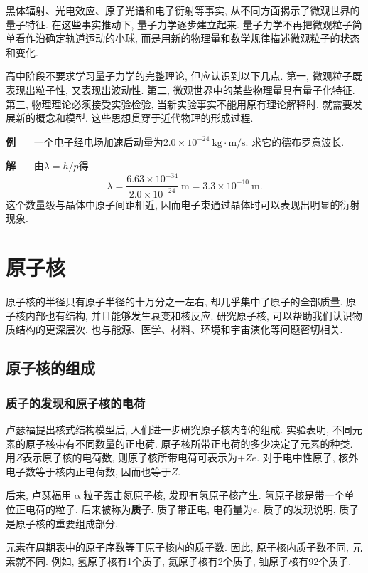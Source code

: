 \documentclass[11pt,a4paper]{ctexbook}
\newcounter{exam}[chapter]
\newcommand{\bre}{\ \ \ }
\newcommand{\examlabel}{\textbf{例\theexam}}
\newcommand{\soln}{\textbf{解}\bre}
\newcommand{\unit}[1]{\ \mathrm{#1}}
\newenvironment{example}{\bigskip\par\refstepcounter{exam}\examlabel\bre}{\par}
\newenvironment{solution}{\par\soln}{\par\bigskip}
\begin{document}
黑体辐射、光电效应、原子光谱和电子衍射等事实, 从不同方面揭示了微观世界的量子特征. 在这些事实推动下, 量子力学逐步建立起来. 量子力学不再把微观粒子简单看作沿确定轨道运动的小球, 而是用新的物理量和数学规律描述微观粒子的状态和变化.

高中阶段不要求学习量子力学的完整理论, 但应认识到以下几点. 第一, 微观粒子既表现出粒子性, 又表现出波动性. 第二, 微观世界中的某些物理量具有量子化特征. 第三, 物理理论必须接受实验检验, 当新实验事实不能用原有理论解释时, 就需要发展新的概念和模型. 这些思想贯穿于近代物理的形成过程.

\begin{example}
一个电子经电场加速后动量为$2.0\times10^{-24}\unit{kg\cdot m/s}$. 求它的德布罗意波长.
\end{example}
\begin{solution}
由$\lambda=h/p$得
$$\lambda=\frac{6.63\times10^{-34}}{2.0\times10^{-24}}\unit{m}=3.3\times10^{-10}\unit{m}.$$
这个数量级与晶体中原子间距相近, 因而电子束通过晶体时可以表现出明显的衍射现象.
\end{solution}

\chapter{原子核}

原子核的半径只有原子半径的十万分之一左右, 却几乎集中了原子的全部质量. 原子核内部也有结构, 并且能够发生衰变和核反应. 研究原子核, 可以帮助我们认识物质结构的更深层次, 也与能源、医学、材料、环境和宇宙演化等问题密切相关.

\section{原子核的组成}

\subsection{质子的发现和原子核的电荷}

卢瑟福提出核式结构模型后, 人们进一步研究原子核内部的组成. 实验表明, 不同元素的原子核带有不同数量的正电荷. 原子核所带正电荷的多少决定了元素的种类. 用$Z$表示原子核的电荷数, 则原子核所带电荷可表示为$+Ze$. 对于电中性原子, 核外电子数等于核内正电荷数, 因而也等于$Z$.

后来, 卢瑟福用$\upalpha$粒子轰击氮原子核, 发现有氢原子核产生. 氢原子核是带一个单位正电荷的粒子, 后来被称为\textbf{质子}. 质子带正电, 电荷量为$e$. 质子的发现说明, 质子是原子核的重要组成部分.

元素在周期表中的原子序数等于原子核内的质子数. 因此, 原子核内质子数不同, 元素就不同. 例如, 氢原子核有1个质子, 氦原子核有2个质子, 铀原子核有92个质子.
\end{document}
